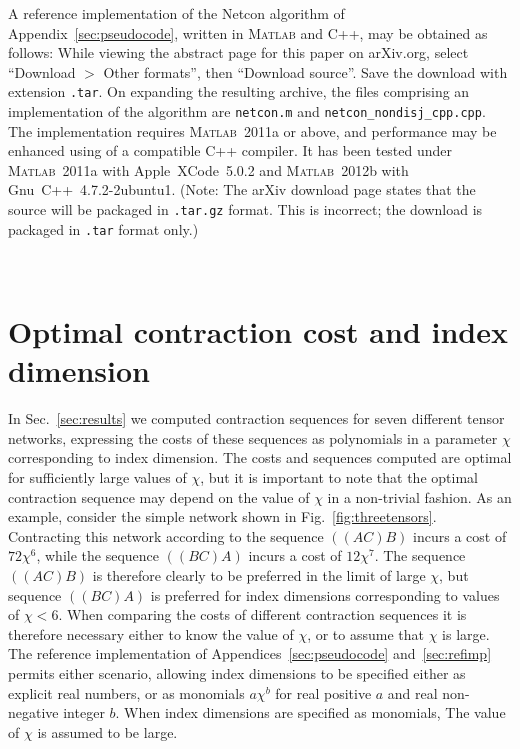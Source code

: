 \documentclass[aps,pre,reprint,superscriptaddress,amsfonts,amsmath,showpacs,nofootinbib,floatfix]{revtex4-1}
\newcommand{\fref}[1]{Fig.~\ref{#1}}
\newcommand{\sref}[1]{Sec.~\ref{#1}}
\newcommand{\aref}[1]{Appendix~\ref{#1}}
\newcommand{\MATLAB}{\textsc{Matlab}}
\newcommand{\ttt}[1]{\texttt{#1}}
\newcommand{\prtext}[1]{}
\newcommand{\arXtext}[1]{#1}
\begin{document}
A reference implementation of the Netcon algorithm\arXtext{ of \aref{sec:pseudocode}}, written in \MATLAB{} and C++, may be\prtext{ found in the %
supplemental material associated with this paper \cite{EPAPS}.}\arXtext{ obtained as follows: While viewing the abstract page for this paper on arXiv.org, select ``Download $>$ Other formats'', then ``Download source''. Save the download with extension \texttt{.tar}. On expanding the resulting archive, the files comprising an implementation of the %
algorithm are \texttt{netcon.m} and \texttt{netcon\_nondisj\_cpp.cpp}.}
The implementation requires \MATLAB{}~2011a or above, and performance may be enhanced using of a compatible C++ compiler. It has been tested under \MATLAB{}~2011a with %
Apple~XCode~5.0.2 and \MATLAB{}~2012b with Gnu~C++~4.7.2-2ubuntu1. \prtext{The network contraction sequences output by the reference implementation are fully compatible with the tensor network contraction packages \ttt{ncon()} and \ttt{multienv()} of Refs.~\onlinecite{pfeifer2014} and~\onlinecite{evenbly2014} respectively.}\arXtext{(Note: The arXiv download page states that the source will be packaged in \texttt{.tar.gz} format. This is incorrect; the download is packaged in \texttt{.tar} format only.)}



\arXtext{}
~

\section{Optimal contraction cost and index dimension\label{sec:chidependency}}

In \sref{sec:results} we computed contraction sequences for seven different tensor networks, expressing the costs of these sequences as polynomials in a parameter $\chi$ corresponding to index dimension. %
The costs and sequences computed are optimal for sufficiently large values of $\chi$, but it is important to note that the optimal contraction sequence may depend on the value of $\chi$ in a non-trivial fashion. As an example,
consider the simple network shown in \fref{fig:threetensors}.
Contracting this network according to the sequence $((AC)B)$ incurs a cost of $72\chi^6$, while the sequence $((BC)A)$ incurs a cost of $12\chi^7$. The sequence $((AC)B)$ is therefore clearly to be preferred in the limit of large $\chi$, but sequence $((BC)A)$ is preferred for index dimensions corresponding to values of $\chi<6$. When comparing the costs of different contraction sequences it is therefore necessary either to know the value of $\chi$, or to assume that $\chi$ is large. The reference implementation of\prtext{ \aref{sec:pseudocode} which is provided in the Supplementary Material \cite{EPAPS}}\arXtext{ Appendices~\ref{sec:pseudocode} and~\ref{sec:refimp}} permits either scenario, allowing index dimensions to be specified either as explicit real numbers, or as monomials $a\chi^b$ for real positive $a$ and real non-negative integer $b$. When index dimensions are specified as monomials, The value of $\chi$ is assumed to be large.


\end{document}

